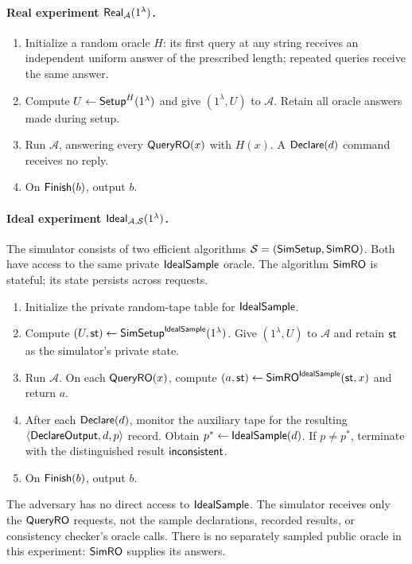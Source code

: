 \paragraph{Real experiment $\mathsf{Real}_{\mathcal A}(1^\lambda)$.}
\begin{enumerate}
  \item Initialize a random oracle $H$: its first query at any string
    receives an independent uniform answer of the prescribed length;
    repeated queries receive the same answer.
  \item Compute $U\mathrel{\leftarrow}\mathsf{Setup}^{H}(1^\lambda)$ and give
    $(1^\lambda,U)$ to $\mathcal A$.  Retain all oracle answers made
    during setup.
  \item Run $\mathcal A$, answering every $\mathsf{QueryRO}(x)$ with $H(x)$.
    A $\mathsf{Declare}(d)$ command receives no reply.
  \item On $\mathsf{Finish}(b)$, output $b$.
\end{enumerate}

\paragraph{Ideal experiment $\mathsf{Ideal}_{\mathcal A,\mathcal S}
(1^\lambda)$.}
The simulator consists of two efficient algorithms
$\mathcal S=(\mathsf{SimSetup},\mathsf{SimRO})$.  Both have access to the
same private $\mathsf{IdealSample}$ oracle.  The algorithm
$\mathsf{SimRO}$ is stateful; its state persists across requests.
\begin{enumerate}
  \item Initialize the private random-tape table for
    $\mathsf{IdealSample}$.
  \item Compute
    $(U,\mathsf{st})\mathrel{\leftarrow}
    \mathsf{SimSetup}^{\mathsf{IdealSample}}(1^\lambda)$.
    Give $(1^\lambda,U)$ to $\mathcal A$ and retain $\mathsf{st}$ as
    the simulator's private state.
  \item Run $\mathcal A$.  On each $\mathsf{QueryRO}(x)$, compute
    $(a,\mathsf{st})\mathrel{\leftarrow}
    \mathsf{SimRO}^{\mathsf{IdealSample}}(\mathsf{st},x)$ and return $a$.
  \item After each $\mathsf{Declare}(d)$, monitor the auxiliary tape for the
    resulting $\langle\mathsf{DeclareOutput},d,p\rangle$ record.  Obtain
    $p^*\gets\mathsf{IdealSample}(d)$.  If $p\ne p^*$, terminate with
    the distinguished result $\mathsf{inconsistent}$.
  \item On $\mathsf{Finish}(b)$, output $b$.
\end{enumerate}
The adversary has no direct access to $\mathsf{IdealSample}$.  The
simulator receives only the $\mathsf{QueryRO}$ requests, not the sample
declarations, recorded results, or consistency checker's oracle calls.
There is no separately sampled public oracle in this experiment:
$\mathsf{SimRO}$ supplies its answers.

